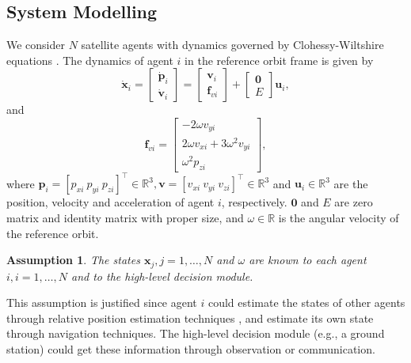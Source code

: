\documentclass{ifacconf}
\newtheorem{assumption}[asmp]{Assumption}
\begin{document}
\subsection{System Modelling}
\par We consider $N$ satellite agents with dynamics governed by Clohessy-Wiltshire equations \cite[]{CWequations}.
The dynamics of agent $i$ in the reference orbit frame is given by
\begin{equation} \label{eqn:dynamics1}
   \dot{\boldsymbol{x}}_i = 
      \begin{bmatrix}
         \dot{\boldsymbol{p}}_i \\ \dot{\boldsymbol{v}}_i
      \end{bmatrix} = 
      \begin{bmatrix}
         \boldsymbol{v}_i \\ \boldsymbol{f}_{vi}
      \end{bmatrix} + 
      \begin{bmatrix}
         \boldsymbol{0} \\ E
      \end{bmatrix} \boldsymbol{u}_i,
\end{equation}
and
\begin{equation} \label{eqn:dynamics2}
   \boldsymbol{f}_{vi} = 
      \begin{bmatrix}
         -2 \omega v_{yi} \\
         2\omega v_{xi} + 3\omega^2 v_{yi} \\
         \omega^2 p_{zi}
      \end{bmatrix},
\end{equation}
where $\boldsymbol{p}_i = [p_{xi}~p_{yi}~p_{zi}]^{\top} \in \mathbb{R}^3, \boldsymbol{v} = [v_{xi}~v_{yi}~v_{zi}]^\top \in \mathbb{R}^3$ and $\boldsymbol{u}_i \in \mathbb{R}^3$ are the position, velocity and acceleration of agent $i$, respectively.
$\boldsymbol{0}$ and $E$ are zero matrix and identity matrix with proper size, and $\omega \in \mathbb{R}$ is the angular velocity of the reference orbit.

\begin{assumption}
The states $\boldsymbol{x}_j, j = 1, \dots, N$ and $\omega$ are known to each agent $i, i = 1, \dots, N$ and to the high-level decision module.
\end{assumption}
\par This assumption is justified since agent $i$ could estimate the states of other agents through relative position estimation techniques \cite[]{Park2024PoseEstimation}, and estimate its own state through navigation techniques.
The high-level decision module (e.g., a ground station) could get these information through observation \cite[]{Pirovano2024detection} or communication.
\end{document}
